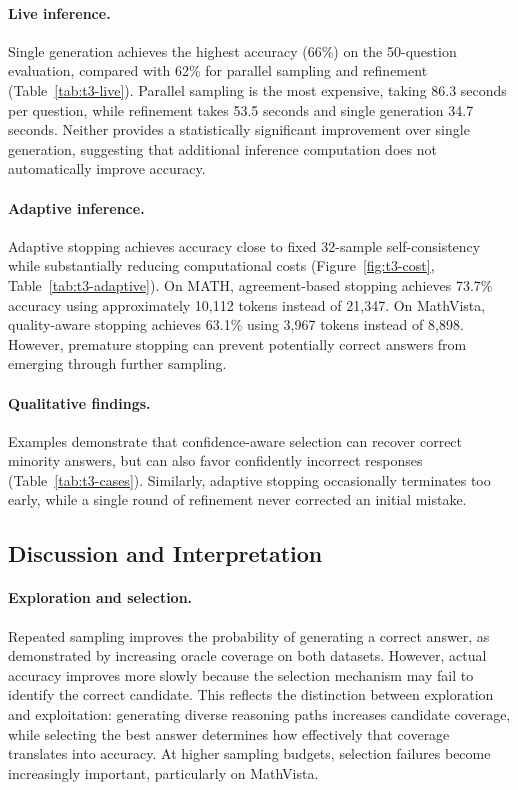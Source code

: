 \documentclass{article}
\begin{document}
\paragraph{Live inference.}
Single generation achieves the highest accuracy (66\%) on the 50-question evaluation, compared with 62\% for parallel sampling and refinement (Table~\ref{tab:t3-live}). Parallel sampling is the most expensive, taking 86.3 seconds per question, while refinement takes 53.5 seconds and single generation 34.7 seconds. Neither provides a statistically significant improvement over single generation, suggesting that additional inference computation does not automatically improve accuracy.

\paragraph{Adaptive inference.}
Adaptive stopping achieves accuracy close to fixed 32-sample self-consistency while substantially reducing computational costs (Figure~\ref{fig:t3-cost}, Table~\ref{tab:t3-adaptive}). On MATH, agreement-based stopping achieves 73.7\% accuracy using approximately 10,112 tokens instead of 21,347. On MathVista, quality-aware stopping achieves 63.1\% using 3,967 tokens instead of 8,898. However, premature stopping can prevent potentially correct answers from emerging through further sampling.

\paragraph{Qualitative findings.}
Examples demonstrate that confidence-aware selection can recover correct minority answers, but can also favor confidently incorrect responses (Table~\ref{tab:t3-cases}). Similarly, adaptive stopping occasionally terminates too early, while a single round of refinement never corrected an initial mistake.







\subsection{Discussion and Interpretation}
\label{sec:tts-discussion}

\paragraph{Exploration and selection.}
Repeated sampling improves the probability of generating a correct answer, as demonstrated by increasing oracle coverage on both datasets. However, actual accuracy improves more slowly because the selection mechanism may fail to identify the correct candidate. This reflects the distinction between exploration and exploitation: generating diverse reasoning paths increases candidate coverage, while selecting the best answer determines how effectively that coverage translates into accuracy. At higher sampling budgets, selection failures become increasingly important, particularly on MathVista.
\end{document}
